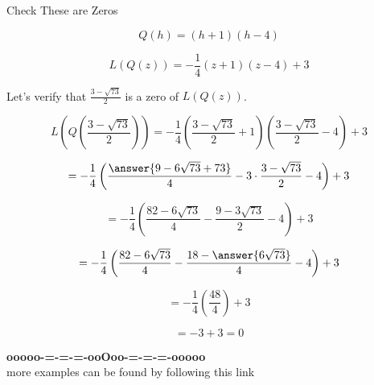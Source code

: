\documentclass{ximera}
\begin{document}
\begin{claim} Check These are Zeros


\[   Q(h) = (h+1)(h-4)   \]


\[   L(Q(z)) = -\frac{1}{4} (z+1)(z-4) + 3   \]


Let's verify that $\frac{3 - \sqrt{73}}{2}$ is a zero of $L(Q(z))$.



\[   L \left( Q \left( \frac{3 - \sqrt{73}}{2} \right) \right) = -\frac{1}{4} \left( \frac{3 - \sqrt{73}}{2}+1 \right) \left( \frac{3 - \sqrt{73}}{2}-4 \right) + 3    \]



\[  = -\frac{1}{4} \left( \frac{\answer{9 - 6 \sqrt{73} + 73}}{4} - 3 \cdot \frac{3 - \sqrt{73}}{2} - 4 \right) + 3    \]


\[  = -\frac{1}{4} \left( \frac{82 - 6 \sqrt{73}}{4} - \frac{9 - 3 \sqrt{73}}{2} - 4 \right) + 3    \]


\[  = -\frac{1}{4} \left( \frac{82 - 6 \sqrt{73}}{4} - \frac{18 - \answer{6 \sqrt{73}}}{4} - 4 \right) + 3    \]


\[  = -\frac{1}{4} \left( \frac{48}{4} \right) + 3    \]


\[  = -3 + 3   = 0 \]


\end{claim}















\begin{center}
\textbf{\textcolor{green!50!black}{ooooo-=-=-=-ooOoo-=-=-=-ooooo}} \\

more examples can be found by following this link\\ 

\end{center}
\end{document}
